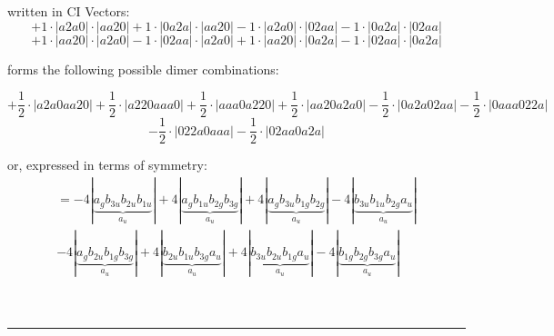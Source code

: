 \documentclass{article}
\begin{document}
\begin{minipage}{\linewidth}
written in CI Vectors: 
 $$+ 1 \cdot \left|a2a0 \right| \cdot \left| aa20 \right| 
+ 1 \cdot \left|0a2a \right| \cdot \left| aa20 \right| 
- 1 \cdot \left|a2a0 \right| \cdot \left| 02aa \right| 
- 1 \cdot \left|0a2a \right| \cdot \left| 02aa \right| 
 $$ $$ + 1 \cdot \left|aa20 \right| \cdot \left| a2a0 \right| 
- 1 \cdot \left|02aa \right| \cdot \left| a2a0 \right| 
+ 1 \cdot \left|aa20 \right| \cdot \left| 0a2a \right| 
- 1 \cdot \left|02aa \right| \cdot \left| 0a2a \right| 
$$



 forms the following possible dimer combinations:

$$+ \frac{1}{2} \cdot \left|a2a0aa20 \right| + \frac{1}{2} \cdot \left|a220aaa0 \right| + \frac{1}{2} \cdot \left|aaa0a220 \right| + \frac{1}{2} \cdot \left|aa20a2a0 \right| - \frac{1}{2} \cdot \left|0a2a02aa \right| - \frac{1}{2} \cdot \left|0aaa022a \right|  $$ $$ - \frac{1}{2} \cdot \left|022a0aaa \right| - \frac{1}{2} \cdot \left|02aa0a2a \right| $$



\end{minipage}
\vspace{0.5cm}


or, expressed in terms of symmetry:\begin{multline*}
=-4\left|\underbrace{a_{g} b_{3u} b_{2u} b_{1u}}_{a_{u}}\right|+4\left|\underbrace{a_{g} b_{1u} b_{2g} b_{3g}}_{a_{u}}\right|+4\left|\underbrace{a_{g} b_{3u} b_{1g} b_{2g}}_{a_{u}}\right|-4\left|\underbrace{b_{3u} b_{1u} b_{2g} a_{u}}_{a_{u}}\right|\\
-4\left|\underbrace{a_{g} b_{2u} b_{1g} b_{3g}}_{a_{u}}\right|+4\left|\underbrace{b_{2u} b_{1u} b_{3g} a_{u}}_{a_{u}}\right|+4\left|\underbrace{b_{3u} b_{2u} b_{1g} a_{u}}_{a_{u}}\right|-4\left|\underbrace{b_{1g} b_{2g} b_{3g} a_{u}}_{a_{u}}\right|
\end{multline*}\\\\

 


\hrule
\vspace{0.5cm}
\end{document}
